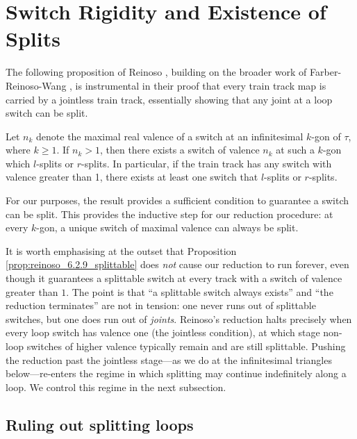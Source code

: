 \section{Switch Rigidity and Existence of Splits}
\label{sec:switch-rigidity}

The following proposition of Reinoso \cite[Corollary~6.2.9]{reinoso2024pseudo}, building on the broader work of Farber-Reinoso-Wang \cite{farber2024fixed}, is instrumental in their proof that every train track map is carried by a jointless train track, essentially showing that any joint at a loop switch can be split.

\begin{prop}
\label{prop:reinoso_6.2.9_splittable}
Let $n_k$ denote the maximal real valence of a switch at an infinitesimal $k$-gon of $\tau$, where $k \ge 1$. If $n_k > 1$, then there exists a switch of valence $n_k$ at such a $k$-gon which $l$-splits or $r$-splits. In particular, if the train track has any switch with valence greater than 1, there exists at least one switch that $l$-splits or $r$-splits.
\end{prop}

For our purposes, the result provides a sufficient condition to guarantee a switch can be split. This provides the inductive step for our reduction procedure: at every $k$-gon, a unique switch of maximal valence can always be split.

It is worth emphasising at the outset that Proposition \ref{prop:reinoso_6.2.9_splittable} does \emph{not} cause our reduction to run forever, even though it guarantees a splittable switch at every track with a switch of valence greater than $1$. The point is that ``a splittable switch always exists'' and ``the reduction terminates'' are not in tension: one never runs out of splittable switches, but one does run out of \emph{joints}. Reinoso's reduction halts precisely when every loop switch has valence one (the jointless condition), at which stage non-loop switches of higher valence typically remain and are still splittable. Pushing the reduction past the jointless stage---as we do at the infinitesimal triangles below---re-enters the regime in which splitting may continue indefinitely along a loop. We control this regime in the next subsection.

\subsection{Ruling out splitting loops}
\label{subsec:ruling-out-loops}

